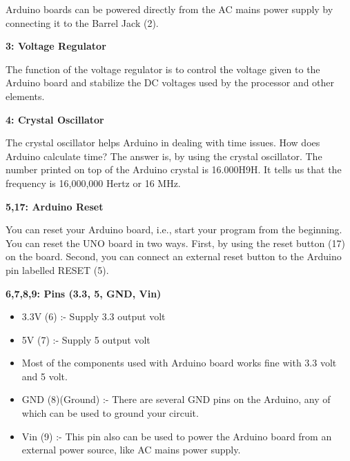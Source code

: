 Arduino boards can be powered directly from the AC mains power supply by connecting it to the Barrel Jack (2).\vspace{.3cm}

\textbf{3: Voltage Regulator}\vspace{.3cm}

The function of the voltage regulator is to control the voltage given to the Arduino board and stabilize the DC voltages used by the processor and other elements.\vspace{.3cm}

\textbf{4: Crystal Oscillator}\vspace{.3cm}

The crystal oscillator helps Arduino in dealing with time issues. How does Arduino calculate time? The answer is, by using the crystal oscillator. The number printed on top of the Arduino crystal is 16.000H9H. It tells us that the frequency is 16,000,000 Hertz or 16 MHz.\vspace{.3cm}

\textbf{5,17: Arduino Reset}\vspace{.3cm}

You can reset your Arduino board, i.e., start your program from the beginning. You can reset the UNO board in two ways. First, by using the reset button (17) on the board. Second, you can connect an external reset button to the Arduino pin labelled RESET (5).\vspace{.3cm}

\textbf{6,7,8,9: Pins (3.3, 5, GND, Vin)}\vspace{.3cm}

\begin{itemize}
	\item 3.3V (6) :- Supply 3.3 output volt
	
	\item 5V (7) :- Supply 5 output volt
	
	\item Most of the components used with Arduino board works fine with 3.3 volt and 5 volt.
	
	\item GND (8)(Ground) :- There are several GND pins on the Arduino, any of which can be used to ground your circuit.
	
	\item Vin (9) :- This pin also can be used to power the Arduino board from an external power source, like AC mains power supply.
\end{itemize}\vspace{.3cm}

